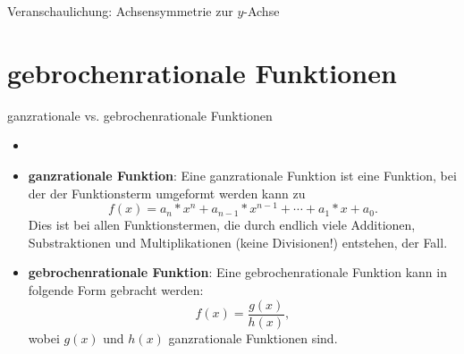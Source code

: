 \begin{marginfigure}
  \caption{Veranschaulichung: Achsensymmetrie zur $y$-Achse}
\end{marginfigure}

\section{gebrochenrationale Funktionen}

\begin{bla}{ganzrationale vs. gebrochenrationale Funktionen}
  \begin{itemize}
    \item[]
    \item \textbf{ganzrationale Funktion}: Eine ganzrationale Funktion ist eine Funktion, bei der der Funktionsterm umgeformt werden kann zu
    \begin{equation*}
       f(x)=a_n*x^n+a_{n-1}*x^{n-1}+\cdots +a_1*x+a_0.
     \end{equation*}
     Dies ist bei allen Funktionstermen, die durch endlich viele Additionen, Substraktionen und Multiplikationen (keine Divisionen!) entstehen, der Fall.
    \item \textbf{gebrochenrationale Funktion}: Eine gebrochenrationale Funktion kann in folgende Form gebracht werden:
    \begin{equation*}
      f(x)=\frac{g(x)}{h(x)},
    \end{equation*}
    wobei $g(x)$ und $h(x)$ ganzrationale Funktionen sind.
  \end{itemize}
\end{bla}

